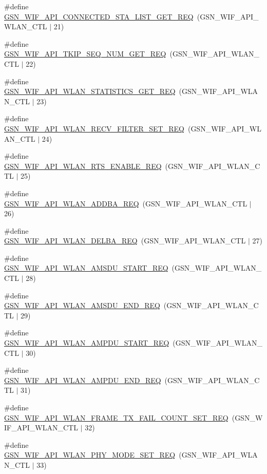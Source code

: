 \begin{DoxyCompactItemize}
\item 
\#define \hyperlink{a00606_ad0d1457143b1e60fce103be6d8e28c23}{GSN\_\-WIF\_\-API\_\-CONNECTED\_\-STA\_\-LIST\_\-GET\_\-REQ}~(GSN\_\-WIF\_\-API\_\-WLAN\_\-CTL $|$ 21)
\item 
\#define \hyperlink{a00606_ac0af89f8f1a179902cd2e7a5b7a637ef}{GSN\_\-WIF\_\-API\_\-TKIP\_\-SEQ\_\-NUM\_\-GET\_\-REQ}~(GSN\_\-WIF\_\-API\_\-WLAN\_\-CTL $|$ 22)
\item 
\#define \hyperlink{a00606_a35bb3dead77b7a506dd5809fd4ceb4e6}{GSN\_\-WIF\_\-API\_\-WLAN\_\-STATISTICS\_\-GET\_\-REQ}~(GSN\_\-WIF\_\-API\_\-WLAN\_\-CTL $|$ 23)
\item 
\#define \hyperlink{a00606_a513b3629b58f0539a9fb6c7b82bee561}{GSN\_\-WIF\_\-API\_\-WLAN\_\-RECV\_\-FILTER\_\-SET\_\-REQ}~(GSN\_\-WIF\_\-API\_\-WLAN\_\-CTL $|$ 24)
\item 
\#define \hyperlink{a00606_a99d545c6a379d1d68302b795ea877018}{GSN\_\-WIF\_\-API\_\-WLAN\_\-RTS\_\-ENABLE\_\-REQ}~(GSN\_\-WIF\_\-API\_\-WLAN\_\-CTL $|$ 25)
\item 
\#define \hyperlink{a00606_a9109b912102b7d0b17a14b970ed407e1}{GSN\_\-WIF\_\-API\_\-WLAN\_\-ADDBA\_\-REQ}~(GSN\_\-WIF\_\-API\_\-WLAN\_\-CTL $|$ 26)
\item 
\#define \hyperlink{a00606_a34c747ff7eeac716d0ab50e7aa73b73a}{GSN\_\-WIF\_\-API\_\-WLAN\_\-DELBA\_\-REQ}~(GSN\_\-WIF\_\-API\_\-WLAN\_\-CTL $|$ 27)
\item 
\#define \hyperlink{a00606_aac0a14ca8e9e988f133dfcdb7b497a2f}{GSN\_\-WIF\_\-API\_\-WLAN\_\-AMSDU\_\-START\_\-REQ}~(GSN\_\-WIF\_\-API\_\-WLAN\_\-CTL $|$ 28)
\item 
\#define \hyperlink{a00606_abbcee4d9c543b34111c56ea552d425fb}{GSN\_\-WIF\_\-API\_\-WLAN\_\-AMSDU\_\-END\_\-REQ}~(GSN\_\-WIF\_\-API\_\-WLAN\_\-CTL $|$ 29)
\item 
\#define \hyperlink{a00606_ad35b5a23c18aba099bcb58f8d97b11df}{GSN\_\-WIF\_\-API\_\-WLAN\_\-AMPDU\_\-START\_\-REQ}~(GSN\_\-WIF\_\-API\_\-WLAN\_\-CTL $|$ 30)
\item 
\#define \hyperlink{a00606_a9397a2ec965fa51d30dacf50c0f1cd1d}{GSN\_\-WIF\_\-API\_\-WLAN\_\-AMPDU\_\-END\_\-REQ}~(GSN\_\-WIF\_\-API\_\-WLAN\_\-CTL $|$ 31)
\item 
\#define \hyperlink{a00606_a2c95af70d6e37fddd526c78e69a75027}{GSN\_\-WIF\_\-API\_\-WLAN\_\-FRAME\_\-TX\_\-FAIL\_\-COUNT\_\-SET\_\-REQ}~(GSN\_\-WIF\_\-API\_\-WLAN\_\-CTL $|$ 32)
\item 
\#define \hyperlink{a00606_a1b9369f2e6e36e28f622f648eea3386f}{GSN\_\-WIF\_\-API\_\-WLAN\_\-PHY\_\-MODE\_\-SET\_\-REQ}~(GSN\_\-WIF\_\-API\_\-WLAN\_\-CTL $|$ 33)

\end{DoxyCompactItemize}
